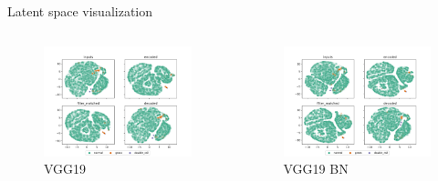 \documentclass[aspectratio=169]{beamer}
\begin{document}
\begin{frame}{Latent space visualization}
    \begin{columns}
        \begin{column}{0.45\textwidth}
            \begin{figure}
                \centering
                \includegraphics[width=\columnwidth,trim={0 0 0 1cm},clip]{./results/vgg19_vgg19/20230510_172958_feature_vectors_1.png}
                \caption*{VGG19}
            \end{figure}
        \end{column}
        \pause
        \begin{column}{0.45\textwidth}
            \begin{figure}
                \centering
                \includegraphics[width=\columnwidth,trim={0 0 0 1cm},clip]{./results/vgg19_bn_vgg19/20230525_045131_feature_vectors_1.png}
                \caption*{VGG19 BN}
            \end{figure}
        \end{column}
    \end{columns}
\end{frame}
\end{document}

